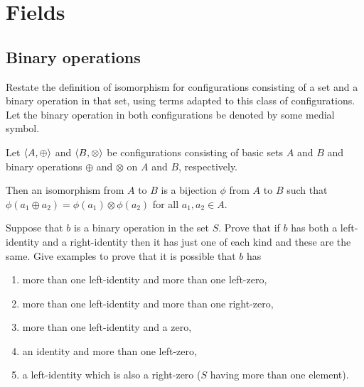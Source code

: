\chapter{Fields}
\section{Binary operations}
\begin{exercise}
Restate the definition of isomorphism for configurations consisting of a set and a
binary operation in that set, using terms adapted to this class of configurations. Let the
binary operation in both configurations be denoted by some medial symbol.
\end{exercise}

\begin{solution}
Let $\left\langle A,\oplus\right\rangle$ and $\left\langle B,\otimes\right\rangle$ be configurations consisting of basic sets
$A$ and $B$ and binary operations $\oplus$ and $\otimes$ on $A$ and $B$, respectively.

Then an isomorphism from $A$ to $B$ is a bijection $\phi$ from $A$ to $B$ such that
$\phi(a_1\oplus a_2)=\phi(a_1)\otimes\phi(a_2)$ for all $a_1,a_2\in A$.
\end{solution}

\begin{exercise}
Suppose that $b$ is a binary operation in the set $S$. Prove that if $b$ has both a
left-identity and a right-identity then it has just one of each kind and these are the same.
Give examples to prove that it is possible that $b$ has
\begin{enumerate}[label=(\alph*)]
    \item more than one left-identity and more than one left-zero,
    \item more than one left-identity and more than one right-zero,
    \item more than one left-identity and a zero,
    \item an identity and more than one left-zero,
    \item a left-identity which is also a right-zero ($S$ having more than one element).
\end{enumerate}
\end{exercise}

